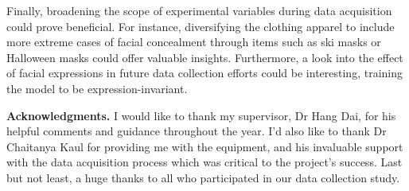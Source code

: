 \documentclass{mpaper}
\begin{document}
Finally, broadening the scope of experimental variables during data acquisition could prove beneficial. For instance, diversifying the clothing apparel to include more extreme cases of facial concealment through items such as ski masks or Halloween masks could offer valuable insights. Furthermore, a look into the effect of facial expressions in future data collection efforts could be interesting, training the model to be expression-invariant.


\vspace{0.4cm}
{\bf Acknowledgments.}
I would like to thank my supervisor, Dr Hang Dai, for his helpful comments and guidance throughout the year. I'd also like to thank Dr Chaitanya Kaul for providing me with the equipment, and his invaluable support with the data acquisition process which was critical to the project's success. Last but not least, a huge thanks to all who participated in our data collection study.




\end{document}
